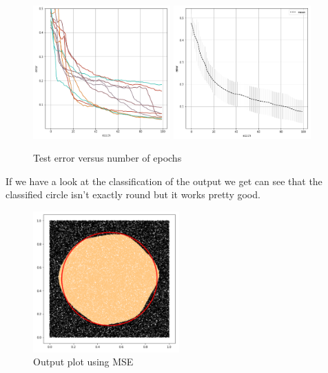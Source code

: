 \documentclass{article}
\begin{document}
\begin{figure}[H]
\begin{center}
\includegraphics[width=0.47\textwidth]{err_mse_sep}
\includegraphics[width=0.47\textwidth]{err_mse}
\caption{Test error versus number of epochs}
\end{center}
\end{figure}

If we have a look at the classification of the output we get can see that the classified circle isn't exactly round but it works pretty good. 

\begin{figure}[H]
\begin{center}
\includegraphics[width=0.5\textwidth]{mse_plot}
\caption{Output plot using MSE}
\end{center}
\end{figure}
\end{document}

